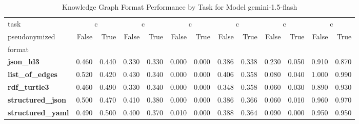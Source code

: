 \begin{table}
\caption{Knowledge Graph Format Performance by Task for Model gemini-1.5-flash}
\label{tab:results_gemini-1.5-flash}
\begin{tabular}{lrrrrrrrrrrrr}
\toprule
task & \multicolumn{2}{c}{c}{AggByRelation} & \multicolumn{2}{c}{c}{AggNeighborProperties} & \multicolumn{2}{c}{c}{HighestDegreeNode} & \multicolumn{2}{c}{c}{Overall} & \multicolumn{2}{c}{c}{ShortestPath} & \multicolumn{2}{c}{c}{TripleRetrieval} \\
pseudonymized & False & True & False & True & False & True & False & True & False & True & False & True \\
format &  &  &  &  &  &  &  &  &  &  &  &  \\
\midrule
\textbf{json_ld3} & 0.460 & 0.440 & 0.330 & 0.330 & 0.000 & 0.000 & 0.386 & 0.338 & 0.230 & 0.050 & 0.910 & 0.870 \\
\textbf{list_of_edges} & 0.520 & 0.420 & 0.430 & 0.340 & 0.000 & 0.000 & 0.406 & 0.358 & 0.080 & 0.040 & 1.000 & 0.990 \\
\textbf{rdf_turtle3} & 0.460 & 0.490 & 0.330 & 0.340 & 0.000 & 0.000 & 0.348 & 0.358 & 0.060 & 0.030 & 0.890 & 0.930 \\
\textbf{structured_json} & 0.500 & 0.470 & 0.410 & 0.380 & 0.000 & 0.000 & 0.386 & 0.366 & 0.060 & 0.010 & 0.960 & 0.970 \\
\textbf{structured_yaml} & 0.490 & 0.500 & 0.400 & 0.370 & 0.010 & 0.000 & 0.388 & 0.364 & 0.090 & 0.000 & 0.950 & 0.950 \\
\bottomrule
\end{tabular}
\end{table}
